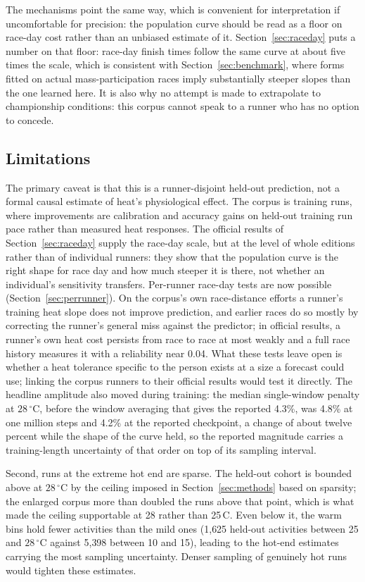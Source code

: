 \documentclass[11pt]{article}
\renewcommand{\_}{\textunderscore\allowbreak}
\begin{document}
The mechanisms point the same way, which is convenient for interpretation if uncomfortable for
precision: the population curve should be read as a floor on race-day cost rather than an unbiased
estimate of it. Section~\ref{sec:raceday} puts a number on that floor: race-day finish times follow the
same curve at about five times the scale, which is consistent with Section~\ref{sec:benchmark}, where forms
fitted on actual mass-participation races imply substantially steeper slopes than the one learned here. It is also why no
attempt is made to extrapolate to championship conditions: this corpus cannot speak to a runner who has
no option to concede.

\subsection{Limitations}

The primary caveat is that this is a runner-disjoint held-out prediction, not a formal causal estimate of heat's physiological effect. The corpus is training runs, where improvements are calibration and accuracy gains on held-out training run pace rather than measured heat responses. The official results of Section~\ref{sec:raceday} supply the race-day scale, but at the level of whole editions rather than of individual runners: they show that the population curve is the right shape for race day and how much steeper it is there, not whether an individual's sensitivity transfers. Per-runner race-day tests are now possible (Section~\ref{sec:perrunner}). On the corpus's own race-distance efforts a runner's training heat slope does not improve prediction, and earlier races do so mostly by correcting the runner's general miss against the predictor; in official results, a runner's own heat cost persists from race to race at most weakly and a full race history measures it with a reliability near 0.04. What these tests leave open is whether a heat tolerance specific to the person exists at a size a forecast could use; linking the corpus runners to their official results would test it directly. The headline amplitude also moved during training: the median single-window penalty at $28\,^{\circ}$C, before the window averaging that gives the reported 4.3\%, was 4.8\% at one million steps and 4.2\% at the reported checkpoint, a change of about twelve percent while the shape of the curve held, so the reported magnitude carries a training-length uncertainty of that order on top of its sampling interval.

Second, runs at the extreme hot end are sparse. The held-out cohort is bounded above at $28\,^{\circ}$C by the ceiling imposed in Section~\ref{sec:methods} based on sparsity; the enlarged corpus more than doubled the runs above that point, which is what made the ceiling supportable at 28 rather than 25\,\textdegree C. Even below it, the warm bins hold fewer activities than the mild ones (1{,}625 held-out activities between 25 and $28\,^{\circ}$C against 5{,}398 between 10 and 15), leading to the hot-end estimates carrying the most sampling uncertainty. Denser sampling of genuinely hot runs would tighten these estimates.
\end{document}
